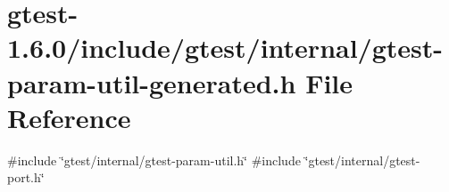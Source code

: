 \hypertarget{gtest-param-util-generated_8h}{\section{gtest-\/1.6.0/include/gtest/internal/gtest-\/param-\/util-\/generated.h \-File \-Reference}
\label{dc/db7/gtest-param-util-generated_8h}
}
{\ttfamily \#include \char`\"{}gtest/internal/gtest-\/param-\/util.\-h\char`\"{}}\*
{\ttfamily \#include \char`\"{}gtest/internal/gtest-\/port.\-h\char`\"{}}\*
